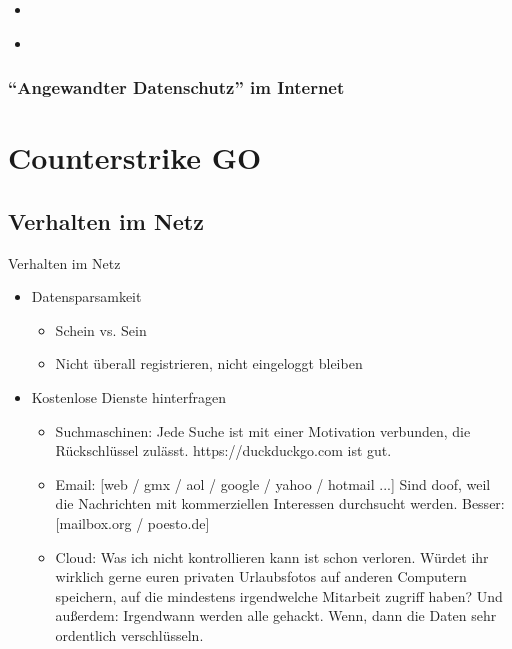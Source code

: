 \documentclass[utf8]{beamer}
\begin{document}
	\begin{frame}
		\begin{itemize}
			\item 
		\end{itemize}
	\end{frame}
	
	\begin{frame}
		\begin{itemize}
			\item 
		\end{itemize}
	\end{frame}
	
	\subsubsection{\enquote{Angewandter Datenschutz} im Internet}
	
	\section{Counterstrike GO}
	\subsection{Verhalten im Netz}
	\begin{frame}{Verhalten im Netz}
		\begin{itemize}
			\item Datensparsamkeit
			\begin{itemize}
				\item Schein vs. Sein
				\item Nicht überall registrieren, nicht eingeloggt bleiben
			\end{itemize}
			\item Kostenlose Dienste hinterfragen
			\begin{itemize}
				\item Suchmaschinen:
				Jede Suche ist mit einer Motivation verbunden, die Rückschlüssel zulässt. https://duckduckgo.com ist gut.
				\item Email:
				[web / gmx / aol / google / yahoo / hotmail ...] Sind doof, weil die Nachrichten mit kommerziellen Interessen durchsucht werden. Besser: [mailbox.org / poesto.de]
				\item Cloud:
				Was ich nicht kontrollieren kann ist schon verloren. Würdet ihr wirklich gerne euren privaten Urlaubsfotos auf anderen Computern speichern, auf die mindestens irgendwelche Mitarbeit zugriff haben? Und außerdem: Irgendwann werden alle gehackt. Wenn, dann die Daten sehr ordentlich verschlüsseln.
			\end{itemize}
		\end{itemize}
	\end{frame}
	
\end{document}
